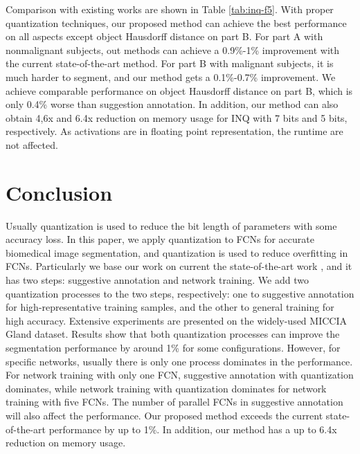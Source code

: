 \documentclass[10pt,twocolumn,letterpaper]{article}
\begin{document}
Comparison with existing works are shown in Table \ref{tab:inq-f5}.
With proper quantization techniques, our proposed method can achieve the best performance on all aspects except object Hausdorff distance on part B.
For part A with nonmalignant subjects, out methods can achieve a 0.9\%-1\% improvement with the current state-of-the-art method.
For part B with malignant subjects, it is much harder to segment, and our method gets a 0.1\%-0.7\% improvement.
We achieve comparable performance on object Hausdorff distance on part B, which is only 0.4\% worse than suggestion annotation.
In addition, our method can also obtain 4,6x and 6.4x reduction on memory usage for INQ with 7 bits and 5 bits, respectively.
As activations are in floating point representation, the runtime are not affected.






\section{Conclusion}
Usually quantization is used to reduce the bit length of parameters with some accuracy loss.
In this paper, we apply quantization to FCNs for accurate biomedical image segmentation, and quantization is used to reduce overfitting in FCNs.
Particularly we base our work on current the state-of-the-art work \cite{yang2017suggestive}, and it has two steps: suggestive annotation and network training.
We add two quantization processes to the two steps, respectively: one to suggestive annotation for high-representative training samples, and the other to general training for high accuracy.
Extensive experiments are presented on the widely-used MICCIA Gland dataset.
Results show that both quantization processes can improve the segmentation performance by around 1\% for some configurations.
However, for specific networks, usually there is only one process dominates in the performance.
For network training with only one FCN, suggestive annotation with quantization dominates, while network training with quantization dominates for network training with five FCNs.
The number of parallel FCNs in suggestive annotation will also affect the performance.
Our proposed method exceeds the current state-of-the-art performance by up to 1\%.
In addition, our method has a up to 6.4x reduction on memory usage.
\end{document}
